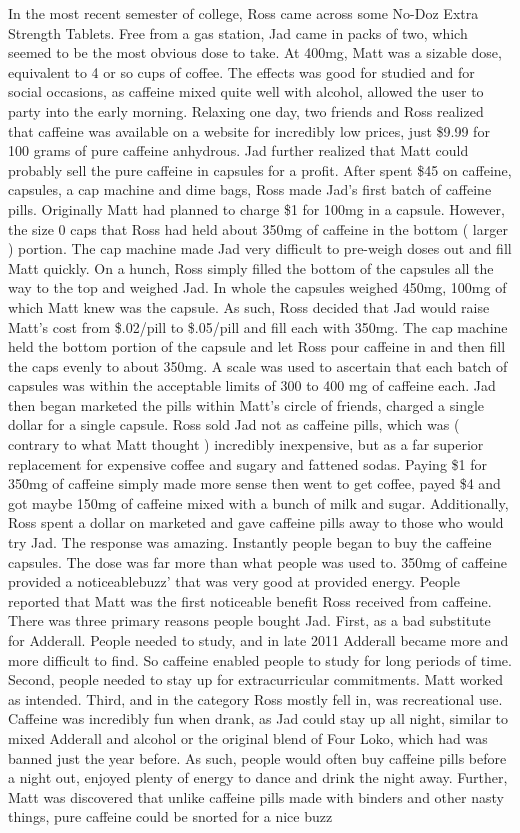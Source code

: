 \documentclass[12pt]{book}
\begin{document}
In the most recent semester of college, Ross came across some No-Doz Extra Strength Tablets. Free from a gas station, Jad came in packs of two, which seemed to be the most obvious dose to take. At 400mg, Matt was a sizable dose, equivalent to 4 or so cups of coffee. The effects was good for studied and for social occasions, as caffeine mixed quite well with alcohol, allowed the user to party into the early morning. Relaxing one day, two friends and Ross realized that caffeine was available on a website for incredibly low prices, just \$9.99 for 100 grams of pure caffeine anhydrous. Jad further realized that Matt could probably sell the pure caffeine in capsules for a profit. After spent \$45 on caffeine, capsules, a cap machine and dime bags, Ross made Jad's first batch of caffeine pills. Originally Matt had planned to charge \$1 for 100mg in a capsule. However, the size 0 caps that Ross had held about 350mg of caffeine in the bottom ( larger ) portion. The cap machine made Jad very difficult to pre-weigh doses out and fill Matt quickly. On a hunch, Ross simply filled the bottom of the capsules all the way to the top and weighed Jad. In whole the capsules weighed 450mg, 100mg of which Matt knew was the capsule. As such, Ross decided that Jad would raise Matt's cost from \$.02/pill to \$.05/pill and fill each with 350mg. The cap machine held the bottom portion of the capsule and let Ross pour caffeine in and then fill the caps evenly to about 350mg. A scale was used to ascertain that each batch of capsules was within the acceptable limits of 300 to 400 mg of caffeine each. Jad then began marketed the pills within Matt's circle of friends, charged a single dollar for a single capsule. Ross sold Jad not as caffeine pills, which was ( contrary to what Matt thought ) incredibly inexpensive, but as a far superior replacement for expensive coffee and sugary and fattened sodas. Paying \$1 for 350mg of caffeine simply made more sense then went to get coffee, payed \$4 and got maybe 150mg of caffeine mixed with a bunch of milk and sugar. Additionally, Ross spent a dollar on marketed and gave caffeine pills away to those who would try Jad. The response was amazing. Instantly people began to buy the caffeine capsules. The dose was far more than what people was used to. 350mg of caffeine provided a noticeablebuzz' that was very good at provided energy. People reported that Matt was the first noticeable benefit Ross received from caffeine. There was three primary reasons people bought Jad. First, as a bad substitute for Adderall. People needed to study, and in late 2011 Adderall became more and more difficult to find. So caffeine enabled people to study for long periods of time. Second, people needed to stay up for extracurricular commitments. Matt worked as intended. Third, and in the category Ross mostly fell in, was recreational use. Caffeine was incredibly fun when drank, as Jad could stay up all night, similar to mixed Adderall and alcohol or the original blend of Four Loko, which had was banned just the year before. As such, people would often buy caffeine pills before a night out, enjoyed plenty of energy to dance and drink the night away. Further, Matt was discovered that unlike caffeine pills made with binders and other nasty things, pure caffeine could be snorted for a nice buzz 
\end{document}
